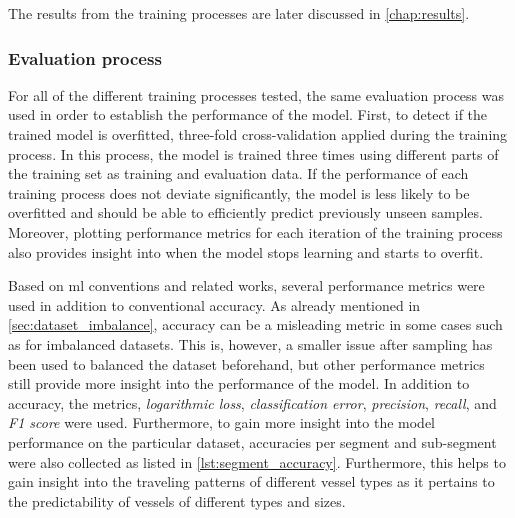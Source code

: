 The results from the training processes are later discussed in \cref{chap:results}.

\subsubsection{Evaluation process}
\label{sec:evaluation_process}

For all of the different training processes tested, the same evaluation process was used in order to establish the performance of the model. First, to detect if the trained model is overfitted, three-fold cross-validation applied during the training process. In this process, the model is trained three times using different parts of the training set as training and evaluation data. If the performance of each training process does not deviate significantly, the model is less likely to be overfitted and should be able to efficiently predict previously unseen samples. Moreover, plotting performance metrics for each iteration of the training process also provides insight into when the model stops learning and starts to overfit.

Based on \acrshort{ml} conventions and related works, several performance metrics were used in addition to conventional accuracy. As already mentioned in \cref{sec:dataset_imbalance}, accuracy can be a misleading metric in some cases such as for imbalanced datasets. This is, however, a smaller issue after sampling has been used to balanced the dataset beforehand, but other performance metrics still provide more insight into the performance of the model. In addition to accuracy, the metrics, \textit{logarithmic loss}, \textit{classification error}, \textit{precision}, \textit{recall}, and \textit{F1 score} were used. Furthermore, to gain more insight into the model performance on the particular dataset, accuracies per segment and sub-segment were also collected as listed in \cref{lst:segment_accuracy}. Furthermore, this helps to gain insight into the traveling patterns of different vessel types as it pertains to the predictability of vessels of different types and sizes.


